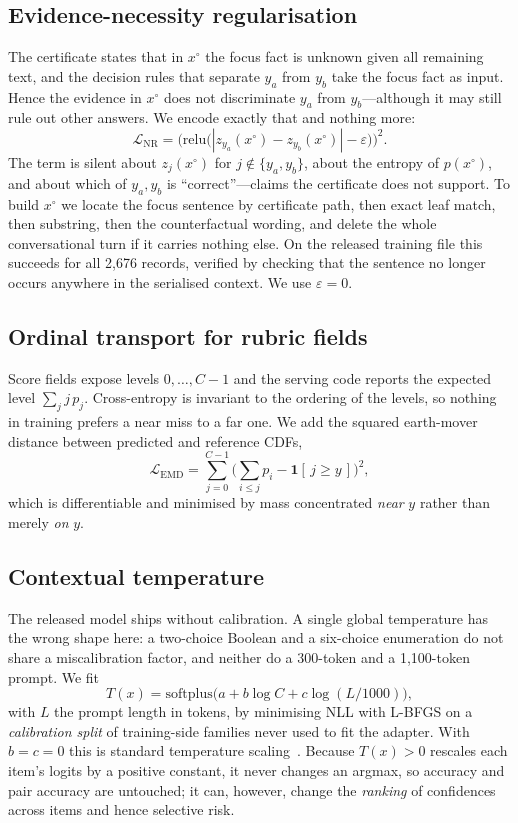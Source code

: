 \documentclass[conference]{IEEEtran}
\newcommand{\Lnr}{\mathcal{L}_{\mathrm{NR}}}
\newcommand{\Lemd}{\mathcal{L}_{\mathrm{EMD}}}
\newcommand{\softplus}{\mathrm{softplus}}
\begin{document}
\subsection{Evidence-necessity regularisation}
\label{sec:nr}
The certificate states that in $x^\circ$ the focus fact is unknown given all
remaining text, and the decision rules that separate $y_a$ from $y_b$ take the
focus fact as input. Hence the evidence in $x^\circ$ does not discriminate
$y_a$ from $y_b$---although it may still rule out other answers. We encode
exactly that and nothing more:
\begin{equation}
\Lnr=\Big(\mathrm{relu}\big(|z_{y_a}(x^\circ)-z_{y_b}(x^\circ)|-\varepsilon\big)\Big)^2 .
\end{equation}
The term is silent about $z_j(x^\circ)$ for $j\notin\{y_a,y_b\}$, about the
entropy of $p(x^\circ)$, and about which of $y_a,y_b$ is ``correct''---claims
the certificate does not support. To build $x^\circ$ we locate the focus
sentence by certificate path, then exact leaf match, then substring, then the
counterfactual wording, and delete the whole conversational turn if it carries
nothing else. On the released training file this succeeds for all 2{,}676
records, verified by checking that the sentence no longer occurs anywhere in
the serialised context. We use $\varepsilon=0$.

\subsection{Ordinal transport for rubric fields}
\label{sec:emd}
Score fields expose levels $0,\dots,C-1$ and the serving code reports the
expected level $\sum_j j\,p_j$. Cross-entropy is invariant to the ordering of
the levels, so nothing in training prefers a near miss to a far one. We add
the squared earth-mover distance between predicted and reference CDFs,
\begin{equation}
\Lemd=\sum_{j=0}^{C-1}\Big(\sum_{i\le j}p_i-\mathbf{1}[\,j\ge y\,]\Big)^2 ,
\end{equation}
which is differentiable and minimised by mass concentrated \emph{near} $y$
rather than merely \emph{on} $y$.

\subsection{Contextual temperature}
\label{sec:temp}
The released model ships without calibration. A single global temperature has
the wrong shape here: a two-choice Boolean and a six-choice enumeration do
not share a miscalibration factor, and neither do a 300-token and a
1{,}100-token prompt. We fit
\begin{equation}
T(x)=\softplus\big(a+b\log C+c\log(L/1000)\big),
\end{equation}
with $L$ the prompt length in tokens, by minimising NLL with L-BFGS on a
\emph{calibration split} of training-side families never used to fit the
adapter. With $b=c=0$ this is standard temperature
scaling~\cite{guo2017calibration}. Because $T(x)>0$ rescales each item's logits
by a positive constant, it never changes an argmax, so accuracy and pair
accuracy are untouched; it can, however, change the \emph{ranking} of
confidences across items and hence selective risk.
\end{document}
